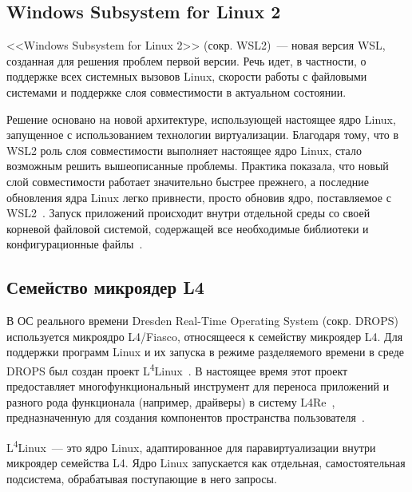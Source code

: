 \subsection{Windows Subsystem for Linux 2}

<<Windows Subsystem for Linux 2>> (сокр. WSL2)~--- новая версия WSL, созданная для решения проблем первой версии. Речь идет, в частности, о поддержке всех системных вызовов Linux, скорости работы с файловыми системами и поддержке слоя совместимости в актуальном состоянии.

Решение основано на новой архитектуре, использующей настоящее ядро Linux, запущенное с использованием технологии виртуализации. Благодаря тому, что в WSL2 роль слоя совместимости выполняет настоящее ядро Linux, стало возможным решить вышеописанные проблемы. Практика показала, что новый слой совместимости работает значительно быстрее прежнего, а последние обновления ядра Linux легко привнести, просто обновив ядро, поставляемое с WSL2~\cite{wsl-2-announce}. Запуск приложений происходит внутри отдельной среды со своей корневой файловой системой, содержащей все необходимые библиотеки и конфигурационные файлы~\cite{wsl-2-linux-files}.


\subsection{Семейство микроядер L4}

В ОС реального времени Dresden Real-Time Operating System (сокр. DROPS) используется микроядро L4/Fiasco, относящееся к семейству микроядер L4. Для поддержки программ Linux и их запуска в режиме разделяемого времени в среде DROPS был создан проект L\textsuperscript{4}Linux~\cite{l4linux}. В настоящее время этот проект предоставляет многофункциональный инструмент для переноса приложений и разного рода функционала (например, драйверы) в систему L4Re~\cite{l4re}, предназначенную для создания компонентов пространства пользователя~\cite{l4linux}.

L\textsuperscript{4}Linux~--- это ядро Linux, адаптированное для паравиртуализации внутри микроядер семейства L4. Ядро Linux запускается как отдельная, самостоятельная подсистема, обрабатывая поступающие в него запросы.


